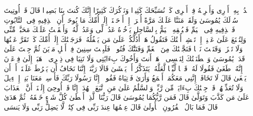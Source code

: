 ٱشۡدُدۡ بِهِۦۤ أَزۡرِی%
\stopbuffer
\startbuffer[\q:20:32]
وَأَشۡرِكۡهُ فِیۤ أَمۡرِی%
\stopbuffer
\startbuffer[\q:20:33]
كَیۡ نُسَبِّحَكَ كَثِیرࣰا%
\stopbuffer
\startbuffer[\q:20:34]
وَنَذۡكُرَكَ كَثِیرًا%
\stopbuffer
\startbuffer[\q:20:35]
إِنَّكَ كُنتَ بِنَا بَصِیرࣰا%
\stopbuffer
\startbuffer[\q:20:36]
قَالَ قَدۡ أُوتِیتَ سُؤۡلَكَ یَٰمُوسَىٰ%
\stopbuffer
\startbuffer[\q:20:37]
وَلَقَدۡ مَنَنَّا عَلَیۡكَ مَرَّةً أُخۡرَىٰۤ%
\stopbuffer
\startbuffer[\q:20:38]
إِذۡ أَوۡحَیۡنَاۤ إِلَىٰۤ أُمِّكَ مَا یُوحَىٰۤ%
\stopbuffer
\startbuffer[\q:20:39]
أَنِ ٱقۡذِفِیهِ فِی ٱلتَّابُوتِ فَٱقۡذِفِیهِ فِی ٱلۡیَمِّ فَلۡیُلۡقِهِ ٱلۡیَمُّ بِٱلسَّاحِلِ یَأۡخُذۡهُ عَدُوࣱّ لِّی وَعَدُوࣱّ لَّهُۥۚ وَأَلۡقَیۡتُ عَلَیۡكَ مَحَبَّةࣰ مِّنِّی وَلِتُصۡنَعَ عَلَىٰ عَیۡنِیۤ%
\stopbuffer
\startbuffer[\q:20:40]
إِذۡ تَمۡشِیۤ أُخۡتُكَ فَتَقُولُ هَلۡ أَدُلُّكُمۡ عَلَىٰ مَن یَكۡفُلُهُۥۖ فَرَجَعۡنَٰكَ إِلَىٰۤ أُمِّكَ كَیۡ تَقَرَّ عَیۡنُهَا وَلَا تَحۡزَنَۚ وَقَتَلۡتَ نَفۡسࣰا فَنَجَّیۡنَٰكَ مِنَ ٱلۡغَمِّ وَفَتَنَّٰكَ فُتُونࣰاۚ فَلَبِثۡتَ سِنِینَ فِیۤ أَهۡلِ مَدۡیَنَ ثُمَّ جِئۡتَ عَلَىٰ قَدَرࣲ یَٰمُوسَىٰ%
\stopbuffer
\startbuffer[\q:20:41]
وَٱصۡطَنَعۡتُكَ لِنَفۡسِی%
\stopbuffer
\startbuffer[\q:20:42]
ٱذۡهَبۡ أَنتَ وَأَخُوكَ بِءَایَٰتِی وَلَا تَنِیَا فِی ذِكۡرِی%
\stopbuffer
\startbuffer[\q:20:43]
ٱذۡهَبَاۤ إِلَىٰ فِرۡعَوۡنَ إِنَّهُۥ طَغَىٰ%
\stopbuffer
\startbuffer[\q:20:44]
فَقُولَا لَهُۥ قَوۡلࣰا لَّیِّنࣰا لَّعَلَّهُۥ یَتَذَكَّرُ أَوۡ یَخۡشَىٰ%
\stopbuffer
\startbuffer[\q:20:45]
قَالَا رَبَّنَاۤ إِنَّنَا نَخَافُ أَن یَفۡرُطَ عَلَیۡنَاۤ أَوۡ أَن یَطۡغَىٰ%
\stopbuffer
\startbuffer[\q:20:46]
قَالَ لَا تَخَافَاۤۖ إِنَّنِی مَعَكُمَاۤ أَسۡمَعُ وَأَرَىٰ%
\stopbuffer
\startbuffer[\q:20:47]
فَأۡتِیَاهُ فَقُولَاۤ إِنَّا رَسُولَا رَبِّكَ فَأَرۡسِلۡ مَعَنَا بَنِیۤ إِسۡرَٰۤءِیلَ وَلَا تُعَذِّبۡهُمۡۖ قَدۡ جِئۡنَٰكَ بِءَایَةࣲ مِّن رَّبِّكَۖ وَٱلسَّلَٰمُ عَلَىٰ مَنِ ٱتَّبَعَ ٱلۡهُدَىٰۤ%
\stopbuffer
\startbuffer[\q:20:48]
إِنَّا قَدۡ أُوحِیَ إِلَیۡنَاۤ أَنَّ ٱلۡعَذَابَ عَلَىٰ مَن كَذَّبَ وَتَوَلَّىٰ%
\stopbuffer
\startbuffer[\q:20:49]
قَالَ فَمَن رَّبُّكُمَا یَٰمُوسَىٰ%
\stopbuffer
\startbuffer[\q:20:50]
قَالَ رَبُّنَا ٱلَّذِیۤ أَعۡطَىٰ كُلَّ شَیۡءٍ خَلۡقَهُۥ ثُمَّ هَدَىٰ%
\stopbuffer
\startbuffer[\q:20:51]
قَالَ فَمَا بَالُ ٱلۡقُرُونِ ٱلۡأُولَىٰ%
\stopbuffer
\startbuffer[\q:20:52]
قَالَ عِلۡمُهَا عِندَ رَبِّی فِی كِتَٰبࣲۖ لَّا یَضِلُّ رَبِّی وَلَا یَنسَى%
\stopbuffer
